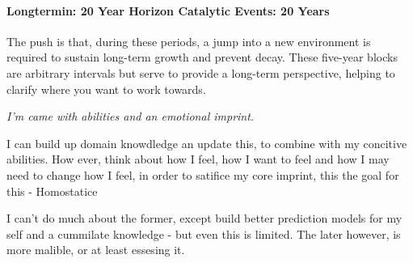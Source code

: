  
 

 
 \paragraph{Longtermin: 20 Year Horizon Catalytic Events: 20 Years}
 
 The push is that, during these periods, a jump into a new environment is required to sustain long-term growth and prevent decay. These five-year blocks are arbitrary intervals but serve to provide a long-term perspective, helping to clarify where you want to work towards.
 
 
 

 
 \textit{I'm came with abilities and an emotional imprint.}
 
 I can build up domain knowdledge an update this, to combine with my concitive abilities. How ever, think about how I feel, how I want to feel and how I may need to change how I feel, in order to satifice my core imprint, this the goal for this - Homostatice
 
 I can't do much about the former, except build better prediction models for my self and a cummilate knowledge - but even this is limited. The later however, is more malible, or at least essesing it.

